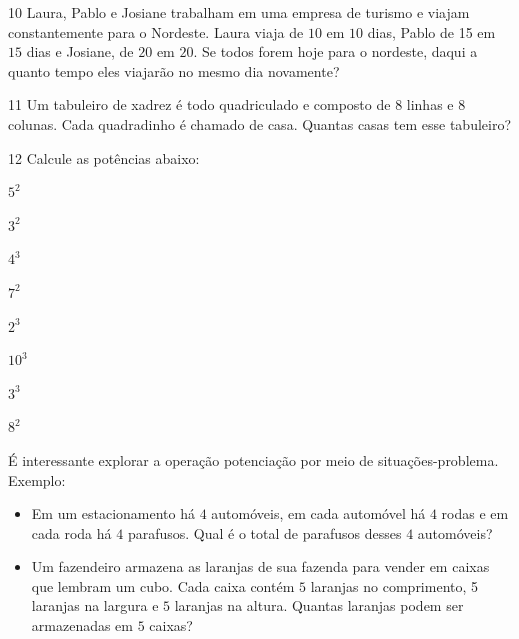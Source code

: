 \num{10} Laura, Pablo e Josiane trabalham em uma empresa de turismo e viajam
constantemente para o Nordeste. Laura viaja de $10$ em $10$ dias, Pablo de
15 em $15$ dias e Josiane, de $20$ em $20$. Se todos forem hoje para o
nordeste, daqui a quanto tempo eles viajarão no mesmo dia novamente?


\num{11} Um tabuleiro de xadrez é todo quadriculado e composto de $8$ linhas e
$8$ colunas. Cada quadradinho é chamado de casa. Quantas casas tem esse
tabuleiro?



\num{12} Calcule as potências abaixo:

\begin{escolha}
\item $5^2$ 
\item $3^2$ 
\item $4^3$ 
\item $7^2$ 
\item $2^3$ 
\item $10^3$ 
\item $3^3$ 
\item $8^2$ 
\end{escolha}

\noindent É interessante explorar a operação potenciação por meio de
situações-problema. Exemplo:

\begin{itemize}
\item Em um estacionamento há $4$ automóveis, em cada automóvel há $4$ rodas e
em cada roda há $4$ parafusos. Qual é o total de parafusos desses $4$
automóveis?

\item Um fazendeiro armazena as laranjas de sua fazenda para vender em
caixas que lembram um cubo. Cada caixa contém $5$ laranjas no comprimento,
5 laranjas na largura e $5$ laranjas na altura. Quantas laranjas podem ser
armazenadas em $5$ caixas?
\end{itemize}


